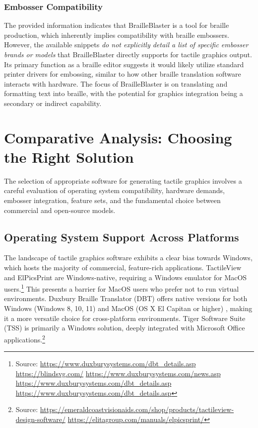 \subsubsection{Embosser Compatibility}

The provided information indicates that BrailleBlaster is a tool for braille production, which inherently implies compatibility with braille embossers. However, the available snippets \emph{do not explicitly detail a list of specific embosser brands or models} that BrailleBlaster directly supports for tactile graphics output. Its primary function as a braille editor suggests it would likely utilize standard printer drivers for embossing, similar to how other braille translation software interacts with hardware. The focus of BrailleBlaster is on translating and formatting text into braille, with the potential for graphics integration being a secondary or indirect capability.

\section{Comparative Analysis: Choosing the Right Solution}\label{sec:comparative-analysis}

The selection of appropriate software for generating tactile graphics involves a careful evaluation of operating system compatibility, hardware demands, embosser integration, feature sets, and the fundamental choice between commercial and open-source models.

\subsection{Operating System Support Across Platforms}

The landscape of tactile graphics software exhibits a clear bias towards Windows, which hosts the majority of commercial, feature-rich applications. TactileView and ElPicsPrint are Windows-native, requiring a Windows emulator for MacOS users.\footnote{Source:  \url{https://www.duxburysystems.com/dbt_details.asp} \url{https://blindsvg.com/} \url{https://www.duxburysystems.com/news.asp} \url{https://www.duxburysystems.com/dbt_details.asp} \url{https://www.duxburysystems.com/dbt_details.asp}} This presents a barrier for MacOS users who prefer not to run virtual environments. Duxbury Braille Translator (DBT) offers native versions for both Windows (Windows 8, 10, 11) and MacOS (OS X El Capitan or higher) \cite{[22, 21, }, making it a more versatile choice for cross-platform environments. Tiger Software Suite (TSS) is primarily a Windows solution, deeply integrated with Microsoft Office applications.\footnote{Source:  \url{https://emeraldcoastvisionaids.com/shop/products/tactileview-design-software/} \url{https://elitagroup.com/manuals/elpicsprint/}}

